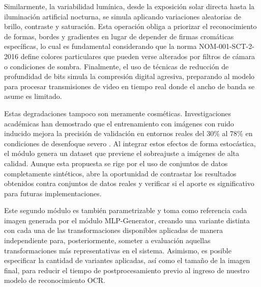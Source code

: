 Similarmente, la variabilidad lumínica, desde la exposición solar directa hasta la iluminación artificial nocturna, se simula aplicando variaciones aleatorias de brillo, contraste y saturación. Esta operación obliga a priorizar el reconocimiento de formas, bordes y gradientes en lugar de depender de firmas cromáticas específicas, lo cual es fundamental considerando que la norma NOM-001-SCT-2-2016 define colores particulares que pueden verse alterados por filtros de cámara o condiciones de sombra. %
Finalmente, el uso de técnicas de reducción de profundidad de bits simula la compresión digital agresiva, preparando al modelo para procesar transmisiones de video en tiempo real donde el ancho de banda se asume es limitado.

Estas degradaciones tampoco son meramente cosméticas. Investigaciones académicas han demostrado que el entrenamiento con imágenes con ruido inducido mejora la precisión de validación en entornos reales del 30\% al 78\% en condiciones de desenfoque severo \cite{albumentations}. Al integrar estos efectos de forma estocástica, el módulo genera un dataset que previene el sobreajuste a imágenes de alta calidad. Aunque esta propuesta se rige por el uso de conjuntos de datos completamente sintéticos, abre la oportunidad de contrastar los resultados obtenidos contra conjuntos de datos reales y verificar si el aporte es significativo para futuras implementaciones.

Este segundo módulo es también parametrizable y toma como referencia cada imagen generada por el módulo MLP-Generator, creando una variante distinta con cada una de las transformaciones disponibles aplicadas de manera independiente para, posteriormente, someter a evaluación aquellas transformaciones más representativas en el sistema. Asimismo, es posible especificar la cantidad de variantes aplicadas, así como el tamaño de la imagen final, para reducir el tiempo de postprocesamiento previo al ingreso de nuestro modelo de reconocimiento OCR.


